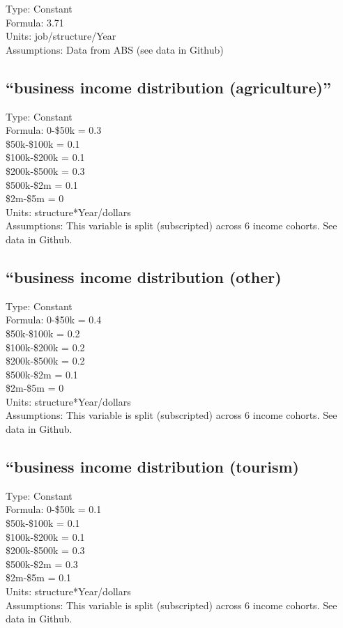 \documentclass[
  11pt,
]{book}
\begin{document}
Type: Constant\\
Formula: 3.71\\
Units: job/structure/Year\\
Assumptions: Data from ABS (see data in Github)

\hypertarget{business-income-distribution-agriculture}{%
\subsection{``business income distribution (agriculture)''}\label{business-income-distribution-agriculture}}

Type: Constant\\
Formula: 0-\$50k = 0.3\\
\$50k-\$100k = 0.1\\
\$100k-\$200k = 0.1\\
\$200k-\$500k = 0.3\\
\$500k-\$2m = 0.1\\
\$2m-\$5m = 0\\
Units: structure*Year/dollars\\
Assumptions: This variable is split (subscripted) across 6 income cohorts. See data in Github.

\hypertarget{business-income-distribution-other}{%
\subsection{``business income distribution (other)}\label{business-income-distribution-other}}

Type: Constant\\
Formula: 0-\$50k = 0.4\\
\$50k-\$100k = 0.2\\
\$100k-\$200k = 0.2\\
\$200k-\$500k = 0.2\\
\$500k-\$2m = 0.1\\
\$2m-\$5m = 0\\
Units: structure*Year/dollars\\
Assumptions: This variable is split (subscripted) across 6 income cohorts. See data in Github.

\hypertarget{business-income-distribution-tourism}{%
\subsection{``business income distribution (tourism)}\label{business-income-distribution-tourism}}

Type: Constant\\
Formula: 0-\$50k = 0.1\\
\$50k-\$100k = 0.1\\
\$100k-\$200k = 0.1\\
\$200k-\$500k = 0.3\\
\$500k-\$2m = 0.3\\
\$2m-\$5m = 0.1\\
Units: structure*Year/dollars\\
Assumptions: This variable is split (subscripted) across 6 income cohorts. See data in Github.
\end{document}

